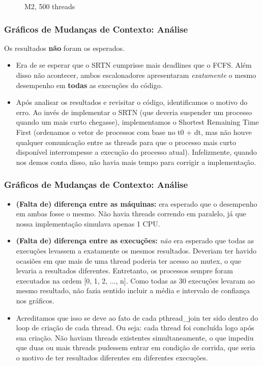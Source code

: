 \documentclass{beamer}
\begin{document}
\begin{frame}
\begin{figure}[!htb]
  \caption{M2, 500 threads}\label{fig:awesome_image3}
\endminipage
\end{figure}


\end{frame}

\begin{frame}
\frametitle{Gráficos de Mudanças de Contexto: Análise}

Os resultados \textbf{não} foram os esperados.

\begin{itemize}
\item Era de se esperar que o SRTN cumprisse mais deadlines que o FCFS. Além disso não acontecer, ambos escalonadores apresentaram \textit{exatamente} o mesmo desempenho em \textbf{todas} as execuções do código. 

\item Após analisar os resultados e revisitar o código, identificamos o motivo do erro. Ao invés de implementar o SRTN (que deveria suspender um processo quando um mais curto chegasse), implementamos o Shortest Remaining Time First (ordenamos o vetor de processos com base no t0 + dt, mas não houve qualquer comunicação entre as threads para que o processo mais curto disponível interrompesse a execução do processo atual). Infelizmente, quando nos demos conta disso, não havia mais tempo para corrigir a implementação.
\end{itemize}

\end{frame}


\begin{frame}
\frametitle{Gráficos de Mudanças de Contexto: Análise}

\begin{itemize}
\item \textbf{(Falta de) diferença entre as máquinas:} era esperado que o desempenho em ambas fosse o mesmo. Não havia threads correndo em paralelo, já que nossa implementação simulava apenas 1 CPU.

\item \textbf{(Falta de) diferença entre as execuções:} \textit{não} era esperado que todas as execuções levassem a exatamente os mesmos resultados. Deveriam ter havido ocasiões em que mais de uma thread poderia ter acesso ao mutex, o que levaria a resultados diferentes. Entretanto, os processos sempre foram executados na ordem [0, 1, 2, ..., n]. Como todas as 30 execuções levaram ao mesmo resultado, não fazia sentido incluir a média e intervalo de confiança nos gráficos.

\item Acreditamos que isso se deve ao fato de cada pthread\_join ter sido dentro do loop de criação de cada thread. Ou seja: cada thread foi concluída logo após sua criação. Não haviam threads existentes simultaneamente, o que impediu que duas ou mais threads pudessem entrar em condição de corrida, que seria o motivo de ter resultados diferentes em diferentes execuções.
\end{itemize}

\end{frame}
\end{document}
